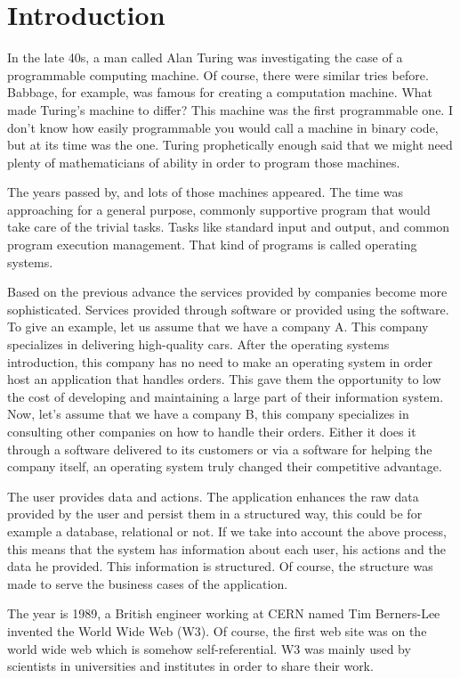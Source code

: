 \section{Introduction}
In the late 40s, a man called Alan Turing was investigating the case of a programmable computing machine. Of course, there were similar tries before. Babbage, for example, was famous for creating a computation machine. What made Turing's machine to differ? This machine was the first programmable one. I don't know how easily programmable you would call a machine in binary code, but at its time was the one. Turing prophetically enough said that we might need plenty of mathematicians of ability in order to program those machines.

The years passed by, and lots of those machines appeared. The time was approaching for a general purpose, commonly supportive program that would take care of the trivial tasks. Tasks like standard input and output, and common program execution management. That kind of programs is called operating systems.

Based on the previous advance the services provided by companies become more sophisticated. Services provided through software or provided using the software. To give an example, let us assume that we have a company A. This company specializes in delivering high-quality cars. After the operating systems introduction, this company has no need to make an operating system in order host an application that handles orders. This gave them the opportunity to low the cost of developing and maintaining a large part of their information system. Now, let's assume that we have a company B, this company specializes in consulting other companies on how to handle their orders. Either it does it through a software delivered to its customers or via a software for helping the company itself, an operating system truly changed their competitive advantage.

The user provides data and actions. The application enhances the raw data provided by the user and persist them in a structured way, this could be for example a database, relational or not. If we take into account the above process, this means that the system has information about each user, his actions and the data he provided. This information is structured. Of course, the structure was made to serve the business cases of the application.

The year is 1989, a British engineer working at CERN named Tim Berners-Lee invented the World Wide Web (W3). Of course, the first web site was on the world wide web which is somehow self-referential. W3 was mainly used by scientists in universities and institutes in order to share their work. 

